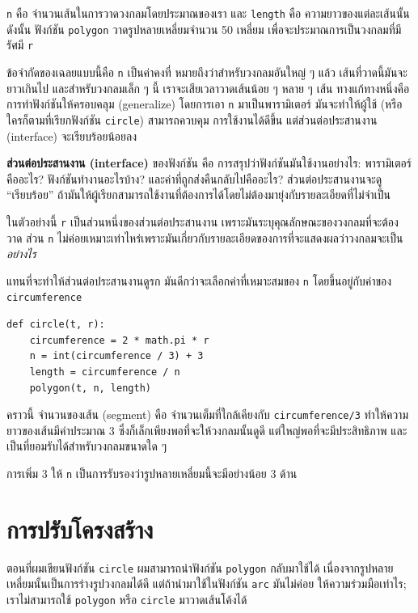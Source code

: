 {\tt n} คือ จำนวนเส้นในการวาดวงกลมโดยประมาณของเรา และ {\tt length} คือ ความยาวของแต่ละเส้นนั้น  
ดังนั้น ฟังก์ชัน {\tt polygon} วาดรูปหลายเหลี่ยมจำนวน 50 เหลี่ยม เพื่อจะประมาณการเป็นวงกลมที่มีรัศมี {\tt r}

ข้อจำกัดของเฉลยแบบนี้คือ {\tt n} เป็นค่าคงที่ หมายถึงว่าสำหรับวงกลมอันใหญ่ ๆ แล้ว เส้นที่วาดนี้มันจะยาวเกินไป
และสำหรับวงกลมเล็ก ๆ นี้ เราจะเสียเวลาวาดเส้นน้อย ๆ หลาย ๆ เส้น ทางแก้ทางหนึ่งคือการทำฟังก์ชันให้ครอบคลุม (generalize)
โดยการเอา {\tt n} มาเป็นพารามิเตอร์ มันจะทำให้ผู้ใช้ (หรือใครก็ตามที่เรียกฟังก์ชัน {\tt circle}) สามารถควบคุม
การใช้งานได้ดีขึ้น แต่ส่วนต่อประสานงาน (interface) จะเรียบร้อยน้อยลง

{\bf ส่วนต่อประสานงาน (interface)} ของฟังก์ชัน คือ การสรุปว่าฟังก์ชันมันใช้งานอย่างไร:
พารามิเตอร์คืออะไร? ฟังก์ชันทำงานอะไรบ้าง? และค่าที่ถูกส่งคืนกลับไปคืออะไร? ส่วนต่อประสานงานจะดู ``เรียบร้อย''
ถ้ามันให้ผู้เรียกสามารถใช้งานที่ต้องการได้โดยไม่ต้องมายุ่งกับรายละเอียดที่ไม่จำเป็น

ในตัวอย่างนี้ {\tt r} เป็นส่วนหนึ่งของส่วนต่อประสานงาน เพราะมันระบุคุณลักษณะของวงกลมที่จะต้องวาด 
ส่วน {\tt n} ไม่ค่อยเหมาะเท่าไหร่เพราะมันเกี่ยวกับรายละเอียดของการที่จะแสดงผลว่าวงกลมจะเป็น {\em อย่างไร} 

แทนที่จะทำให้ส่วนต่อประสานงานดูรก มันดีกว่าจะเลือกค่าที่เหมาะสมของ {\tt n} โดยขึ้นอยู่กับค่าของ {\tt circumference}

\begin{verbatim}
def circle(t, r):
    circumference = 2 * math.pi * r
    n = int(circumference / 3) + 3
    length = circumference / n
    polygon(t, n, length)
\end{verbatim}
%
คราวนี้ จำนวนของเส้น (segment) คือ จำนวนเต็มที่ใกล้เคียงกับ {\tt circumference/3} ทำให้ความยาวของเส้นมีค่าประมาณ 3 
ซึ่งก็เล็กเพียงพอที่จะให้วงกลมนั้นดูดี แต่ใหญ่พอที่จะมีประสิทธิภาพ และเป็นที่ยอมรับได้สำหรับวงกลมขนาดใด ๆ

การเพิ่ม 3 ให้ {\tt n} เป็นการรับรองว่ารูปหลายเหลี่ยมนี้จะมีอย่างน้อย 3 ด้าน

\section{การปรับโครงสร้าง} %
\label{refactoring}

ตอนที่ผมเขียนฟังก์ชัน {\tt circle} ผมสามารถนำฟังก์ชัน {\tt polygon} กลับมาใช้ได้
เนื่องจากรูปหลายเหลี่ยมนั้นเป็นการร่างรูปวงกลมได้ดี  แต่ถ้านำมาใช้ในฟังก์ชัน {\tt arc} มันไม่ค่อย
ให้ความร่วมมือเท่าไร; เราไม่สามารถใช้ {\tt polygon} หรือ {\tt circle} มาวาดเส้นโค้งได้  


